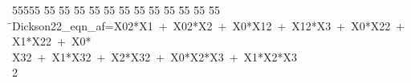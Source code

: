 %
%
\begin{tabbing}
55555 \= 55 \= 55 \= 55 \= 55 \= 55 \= 55 \= 55 \= 55 \= 55 \= 55 \= 55 \= 55 \= \>Dickson22\_eqn\_af=X02*X1\ +\ X02*X2\ +\ X0*X12\ +\ X12*X3\ +\ X0*X22\ +\ X1*X22\ +\ X0*\\[0pt]
\>X32\ +\ X1*X32\ +\ X2*X32\ +\ X0*X2*X3\ +\ X1*X2*X3\\[0pt]
2\>\end{tabbing}
